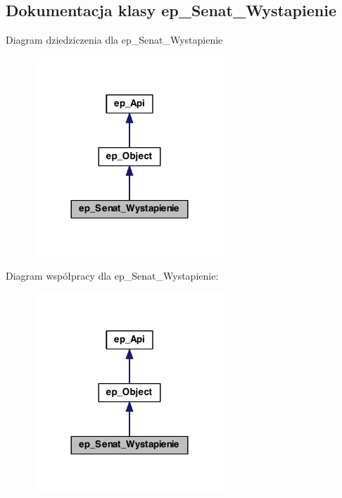 \hypertarget{classep___senat___wystapienie}{\subsection{Dokumentacja klasy ep\-\_\-\-Senat\-\_\-\-Wystapienie}
\label{classep___senat___wystapienie}
}


Diagram dziedziczenia dla ep\-\_\-\-Senat\-\_\-\-Wystapienie\nopagebreak
\begin{figure}[H]
\begin{center}
\leavevmode
\includegraphics[width=204pt]{classep___senat___wystapienie__inherit__graph}
\end{center}
\end{figure}


Diagram współpracy dla ep\-\_\-\-Senat\-\_\-\-Wystapienie\-:\nopagebreak
\begin{figure}[H]
\begin{center}
\leavevmode
\includegraphics[width=204pt]{classep___senat___wystapienie__coll__graph}
\end{center}
\end{figure}
